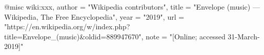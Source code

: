 @misc{ wiki:xxx,
    author = "{Wikipedia contributors}",
    title = "Envelope (music) --- {Wikipedia}{,} The Free Encyclopedia",
    year = "2019",
    url = "https://en.wikipedia.org/w/index.php?title=Envelope_(music)&oldid=889947670",
    note = "[Online; accessed 31-March-2019]"
  }
